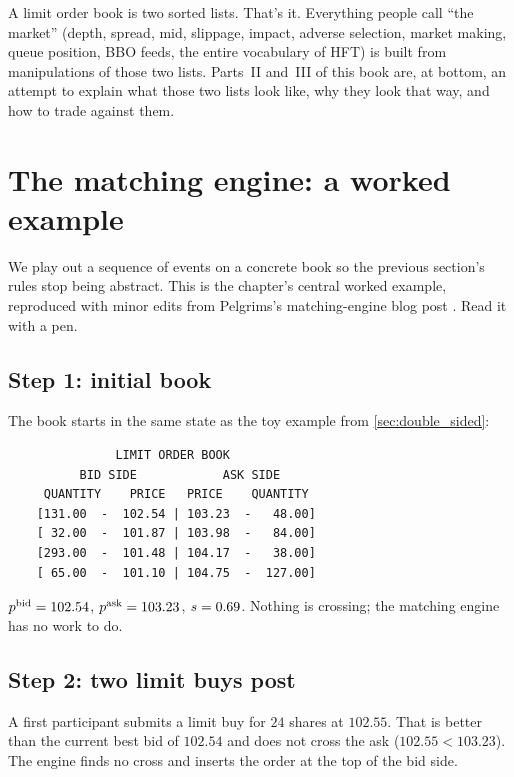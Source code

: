 \begin{intuitionbox}
A limit order book is two sorted lists. That's it. Everything people
call ``the market'' (depth, spread, mid, slippage, impact, adverse
selection, market making, queue position, BBO feeds, the entire
vocabulary of HFT) is built from manipulations of those two lists.
Parts~II and~III of this book are, at bottom, an attempt to explain
what those two lists look like, why they look that way, and how to
trade against them.
\end{intuitionbox}

\section{The matching engine: a worked example}
\label{sec:matching_worked}

We play out a sequence of events on a concrete book so the previous
section's rules stop being abstract. This is the chapter's central
worked example, reproduced with minor edits from Pelgrims's
matching-engine blog post \citep{pelgrims2020matching}. Read it with
a pen.

\subsection{Step 1: initial book}

The book starts in the same state as the toy example from
\cref{sec:double_sided}:

\begin{verbatim}
               LIMIT ORDER BOOK
          BID SIDE            ASK SIDE
     QUANTITY    PRICE   PRICE    QUANTITY
    [131.00  -  102.54 | 103.23  -   48.00]
    [ 32.00  -  101.87 | 103.98  -   84.00]
    [293.00  -  101.48 | 104.17  -   38.00]
    [ 65.00  -  101.10 | 104.75  -  127.00]
\end{verbatim}

$p^{\mathrm{bid}} = 102.54$, $p^{\mathrm{ask}} = 103.23$, $s = 0.69$. Nothing is
crossing; the matching engine has no work to do.

\subsection{Step 2: two limit buys post}

A first participant submits a limit buy for $24$ shares at $102.55$.
That is better than the current best bid of $102.54$ and does not
cross the ask ($102.55 < 103.23$). The engine finds no cross and
inserts the order at the top of the bid side.

